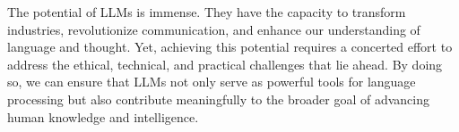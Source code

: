 The potential of LLMs is immense.
They have the capacity to transform industries, revolutionize communication, and enhance our understanding of language and thought.
Yet, achieving this potential requires a concerted effort to address the ethical, technical, and practical challenges that lie ahead.
By doing so, we can ensure that LLMs not only serve as powerful tools for language processing but also contribute meaningfully to the broader goal of advancing human knowledge and intelligence.